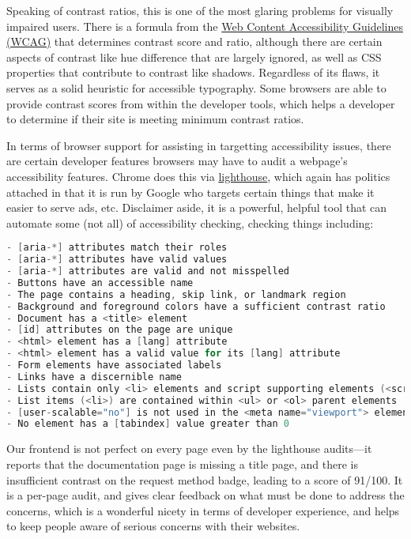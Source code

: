 \documentclass[11pt, twoside, reqno]{book}
\begin{document}
Speaking of contrast ratios, this is one of the most glaring problems for visually impaired users. There is a formula from the \href{https://www.w3.org/TR/2008/REC-WCAG20-20081211/#relativeluminancedef}{Web Content Accessibility Guidelines (WCAG)} that determines contrast score and ratio, although there are certain aspects of contrast like hue difference that are largely ignored, as well as CSS properties that contribute to contrast like shadows. Regardless of its flaws, it serves as a solid heuristic for accessible typography. Some browsers are able to provide contrast scores from within the developer tools, which helps a developer to determine if their site is meeting minimum contrast ratios.

In terms of browser support for assisting in targetting accessibility issues, there are certain developer features browsers may have to audit a webpage's accessibility features. Chrome does this via \href{https://developers.google.com/web/tools/lighthouse/}{lighthouse}, which again has politics attached in that it is run by Google who targets certain things that make it easier to serve ads, etc. Disclaimer aside, it is a powerful, helpful tool that can automate some (not all) of accessibility checking, checking things including:
\begin{lstlisting}[language=C]
- [aria-*] attributes match their roles
- [aria-*] attributes have valid values
- [aria-*] attributes are valid and not misspelled
- Buttons have an accessible name
- The page contains a heading, skip link, or landmark region
- Background and foreground colors have a sufficient contrast ratio
- Document has a <title> element
- [id] attributes on the page are unique
- <html> element has a [lang] attribute
- <html> element has a valid value for its [lang] attribute
- Form elements have associated labels
- Links have a discernible name
- Lists contain only <li> elements and script supporting elements (<script> and - <template>).
- List items (<li>) are contained within <ul> or <ol> parent elements
- [user-scalable="no"] is not used in the <meta name="viewport"> element and the - [maximum-scale] attribute is not less than 5.
- No element has a [tabindex] value greater than 0
\end{lstlisting}

Our frontend is not perfect on every page even by the lighthouse audits—it reports that the documentation page is missing a title page, and there is insufficient contrast on the request method badge, leading to a score of 91/100. It is a per-page audit, and gives clear feedback on what must be done to address the concerns, which is a wonderful nicety in terms of developer experience, and helps to keep people aware of serious concerns with their websites.
\end{document}
